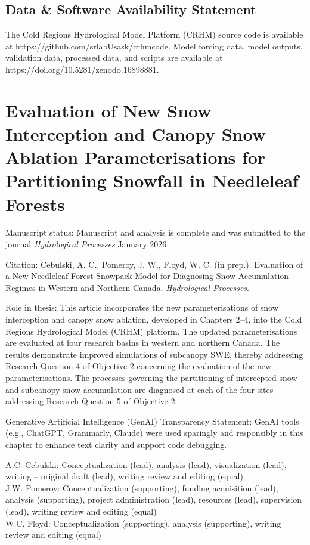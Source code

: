 \documentclass[
  letterpaper,
]{tex/uofsthesis-cs}
\begin{document}
\section{Data \& Software Availability
Statement}\label{data-software-availability-statement}

The Cold Regions Hydrological Model Platform (CRHM) source code is
available at https://github.com/srlabUsask/crhmcode. Model forcing data,
model outputs, validation data, processed data, and scripts are
available at https://doi.org/10.5281/zenodo.16898881.


\chapter{Evaluation of New Snow Interception and Canopy Snow Ablation
Parameterisations for Partitioning Snowfall in Needleleaf
Forests}\label{sec-chapter-5}

Manuscript status: Manuscript and analysis is complete and was submitted
to the journal \emph{Hydrological Processes} January 2026.

Citation: Cebulski, A. C., Pomeroy, J. W., Floyd, W. C. (in prep.).
Evaluation of a New Needleleaf Forest Snowpack Model for Diagnosing Snow
Accumulation Regimes in Western and Northern Canada. \emph{Hydrological
Processes}.

Role in thesis: This article incorporates the new parameterisations of
snow interception and canopy snow ablation, developed in Chapters 2--4,
into the Cold Regions Hydrological Model (CRHM) platform. The updated
parameterisations are evaluated at four research basins in western and
northern Canada. The results demonstrate improved simulations of
subcanopy SWE, thereby addressing Research Question 4 of Objective 2
concerning the evaluation of the new parameterisations. The processes
governing the partitioning of intercepted snow and subcanopy snow
accumulation are diagnosed at each of the four sites addressing Research
Question 5 of Objective 2.

Generative Artificial Intelligence (GenAI) Transparency Statement: GenAI
tools (e.g., ChatGPT, Grammarly, Claude) were used sparingly and
responsibly in this chapter to enhance text clarity and support code
debugging.

A.C. Cebulski: Conceptualization (lead), analysis (lead), visualization
(lead), writing -- original draft (lead), writing review and editing
(equal)\\
J.W. Pomeroy: Conceptualization (supporting), funding acquisition
(lead), analysis (supporting), project administration (lead), resources
(lead), supervision (lead), writing review and editing (equal)\\
W.C. Floyd: Conceptualization (supporting), analysis (supporting),
writing review and editing (equal)
\end{document}
